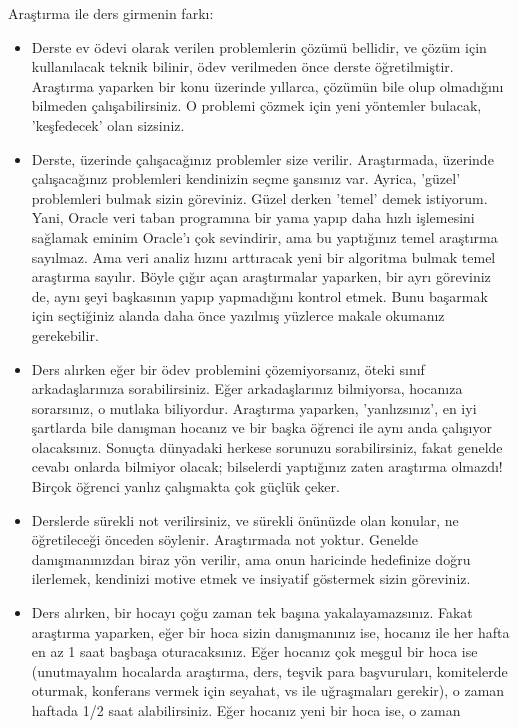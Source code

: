 \documentclass[12pt,fleqn]{article}\usepackage{../../common}
\begin{document}
Araştırma ile ders girmenin farkı:

\begin{itemize}
\item Derste ev ödevi olarak verilen problemlerin çözümü bellidir, ve çözüm
  için kullanılacak teknik bilinir, ödev verilmeden önce derste
  öğretilmiştir. Araştırma yaparken bir konu üzerinde yıllarca, çözümün
  bile olup olmadığını bilmeden çalışabilirsiniz. O problemi çözmek için
  yeni yöntemler bulacak, 'keşfedecek' olan sizsiniz.
\item Derste, üzerinde çalışacağınız problemler size verilir. Araştırmada,
  üzerinde çalışacağınız problemleri kendinizin seçme şansınız
  var. Ayrica, 'güzel' problemleri bulmak sizin göreviniz. Güzel derken
  'temel' demek istiyorum. Yani, Oracle veri taban programına bir yama
  yapıp daha hızlı işlemesini sağlamak eminim Oracle'ı çok sevindirir, ama
  bu yaptığınız temel araştırma sayılmaz. Ama veri analiz hızını arttıracak
  yeni bir algoritma bulmak temel araştırma sayılır. Böyle çığır açan
  araştırmalar yaparken, bir ayrı göreviniz de, aynı şeyi başkasının yapıp
  yapmadığını kontrol etmek. Bunu başarmak için seçtiğiniz alanda daha önce
  yazılmış yüzlerce makale okumanız gerekebilir.
\item Ders alırken eğer bir ödev problemini çözemiyorsanız, öteki sınıf
  arkadaşlarınıza sorabilirsiniz. Eğer arkadaşlarınız bilmiyorsa, hocanıza
  sorarsınız, o mutlaka biliyordur. Araştırma yaparken, 'yanlızsınız', en
  iyi şartlarda bile danışman hocanız ve bir başka öğrenci ile aynı anda
  çalışıyor olacaksınız. Sonuçta dünyadaki herkese sorunuzu sorabilirsiniz,
  fakat genelde cevabı onlarda bilmiyor olacak; bilselerdi yaptığınız zaten
  araştırma olmazdı! Birçok öğrenci yanlız çalışmakta çok güçlük çeker.
\item Derslerde sürekli not verilirsiniz, ve sürekli önünüzde olan konular,
  ne öğretileceği önceden söylenir. Araştırmada not yoktur. Genelde
  danışmanınızdan biraz yön verilir, ama onun haricinde hedefinize doğru
  ilerlemek, kendinizi motive etmek ve insiyatif göstermek sizin göreviniz.
\item Ders alırken, bir hocayı çoğu zaman tek başına
  yakalayamazsınız. Fakat araştırma yaparken, eğer bir hoca sizin
  danışmanınız ise, hocanız ile her hafta en az 1 saat başbaşa
  oturacaksınız. Eğer hocanız çok meşgul bir hoca ise (unutmayalım
  hocalarda araştırma, ders, teşvik para başvuruları, komitelerde oturmak,
  konferans vermek için seyahat, vs ile uğraşmaları gerekir), o zaman
  haftada 1/2 saat alabilirsiniz. Eğer hocanız yeni bir hoca ise, o zaman

\end{itemize}
\end{document}

